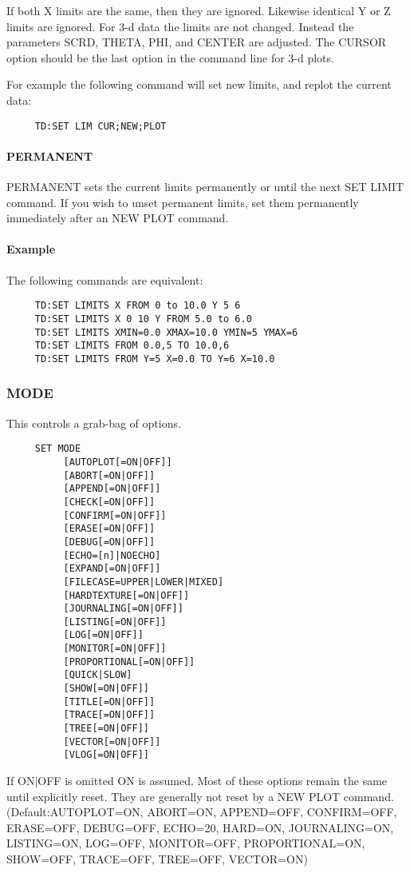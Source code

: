 If both X limits are the same, then they are ignored.  Likewise
identical Y or Z limits are ignored.  For 3-d data the limits are not
changed.  Instead the parameters SCRD, THETA, PHI, and CENTER are
adjusted.  The CURSOR option should be the last option in the command
line for 3-d plots.  

For example the following command will set new limits, and replot the
current data:  
\begin{verbatim}
     TD:SET LIM CUR;NEW;PLOT 
\end{verbatim}
\paragraph{PERMANENT}
PERMANENT sets the current limits permanently or until the next SET
LIMIT command.  If you wish to unset permanent limits, set them
permanently immediately after an NEW PLOT command.  
\paragraph{Example}
The following commands are equivalent:  
\begin{verbatim}
     TD:SET LIMITS X FROM 0 to 10.0 Y 5 6 
     TD:SET LIMITS X 0 10 Y FROM 5.0 to 6.0 
     TD:SET LIMITS XMIN=0.0 XMAX=10.0 YMIN=5 YMAX=6 
     TD:SET LIMITS FROM 0.0,5 TO 10.0,6 
     TD:SET LIMITS FROM Y=5 X=0.0 TO Y=6 X=10.0 
\end{verbatim}
\subsubsection{MODE}
This controls a grab-bag of options.  
\begin{verbatim}
     SET MODE 
          [AUTOPLOT[=ON|OFF]] 
          [ABORT[=ON|OFF]] 
          [APPEND[=ON|OFF]] 
          [CHECK[=ON|OFF]] 
          [CONFIRM[=ON|OFF]] 
          [ERASE[=ON|OFF]] 
          [DEBUG[=ON|OFF]] 
          [ECHO=[n]|NOECHO] 
          [EXPAND[=ON|OFF]] 
          [FILECASE=UPPER|LOWER|MIXED] 
          [HARDTEXTURE[=ON|OFF]] 
          [JOURNALING[=ON|OFF]] 
          [LISTING[=ON|OFF]] 
          [LOG[=ON|OFF]] 
          [MONITOR[=ON|OFF]] 
          [PROPORTIONAL[=ON|OFF]] 
          [QUICK|SLOW] 
          [SHOW[=ON|OFF]] 
          [TITLE[=ON|OFF]] 
          [TRACE[=ON|OFF]] 
          [TREE[=ON|OFF]] 
          [VECTOR[=ON|OFF]] 
          [VLOG[=ON|OFF]] 
\end{verbatim}
If ON$|$OFF is omitted ON is assumed.  Most of these options remain the
same until explicitly reset.  They are generally not reset by a
NEW PLOT command.  
(Default:AUTOPLOT=ON, ABORT=ON, APPEND=OFF, CONFIRM=OFF, ERASE=OFF,
DEBUG=OFF, ECHO=20, HARD=ON, JOURNALING=ON, LISTING=ON, LOG=OFF,
MONITOR=OFF, PROPORTIONAL=ON, SHOW=OFF, TRACE=OFF, TREE=OFF, VECTOR=ON) 
